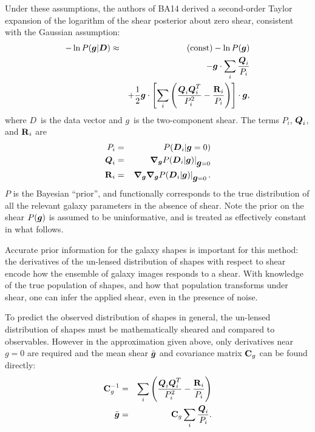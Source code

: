 \documentclass[usegraphicx,usenatbib]{mn2e}
\newcommand{\vecg}{\mbox{\boldmath $g$}}
\newcommand{\vecD}{\mbox{\boldmath $D$}}
\newcommand{\vecQ}{\mbox{\boldmath $Q$}}
\newcommand{\matR}{\mbox{$\bf R$}}
\newcommand{\matC}{\mbox{$\bf C$}}
\newcommand{\bnabg}{ \boldsymbol{\nabla_g}}
\begin{document}
Under these assumptions, the authors of BA14 derived a second-order Taylor
expansion of the logarithm of the shear posterior about zero shear, consistent
with the Gaussian assumption:
\begin{eqnarray} \label{eq:pexpand}
    -\ln P(\vecg | \vecD) & \approx & {(\rm const)} - \ln P(\vecg) \nonumber \\
                          & & - \vecg \cdot \sum_i \frac{\vecQ_i}{P_i} \\
    & &
    + \frac{1}{2} \vecg \cdot \left[ \sum_i \left(\frac{\vecQ_i \vecQ^T_i}{P_i^2}
    - \frac{\matR_i}{P_i}\right) \right] \cdot \vecg, \nonumber
\end{eqnarray}
where \vecD\ is the data vector and \vecg\ is the two-component shear.  The
terms $P_i$, $\vecQ_i$, and $\matR_i$ are 
\begin{eqnarray} \label{eq:pqrdef}
P_i     & = & P(\vecD_i | \vecg=0) \nonumber \\
\vecQ_i & = & \left. \bnabg P(\vecD_i | \vecg)\right|_{\vecg=0} \\
\matR_i & = & \left. \bnabg \bnabg P(\vecD_i | \vecg)\right|_{\vecg=0}. \nonumber
\end{eqnarray}
$P$ is the Bayesian ``prior'', and functionally corresponds to the true
distribution of all the relevant galaxy parameters in the absence of shear.
Note the prior on the shear $P(\vecg)$ is assumed to be uninformative, and is
treated as effectively constant in what follows.

Accurate prior information for the galaxy shapes is important for this method:
the derivatives of the un-lensed distribution of shapes with respect to shear
encode how the ensemble of galaxy images responds to a shear. With knowledge of
the true population of shapes, and how that population transforms under shear,
one can infer the applied shear, even in the presence of noise.

To predict the observed distribution of shapes in general, the un-lensed
distribution of shapes must be mathematically sheared and compared to
observables.  However in the approximation given above, only derivatives near
$g=0$ are required and the mean shear $\bar{\vecg}$ and covariance matrix
$\matC_g$ can be found directly:
\begin{eqnarray}
\matC_g^{-1} & = & \sum_i \left(\frac{\vecQ_i \vecQ^T_i}{P_i^2} - \frac{\matR_i}{P_i}\right) \label{eq:cdef} \nonumber \\
\bar{\vecg} & = &  \matC_g \sum_i \frac{\vecQ_i}{P_i}. \label{eq:shdef}
\end{eqnarray}
\end{document}
